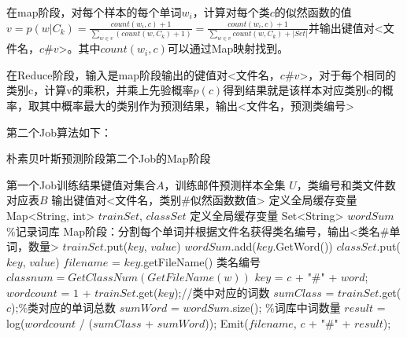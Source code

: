 \documentclass[lang=cn,11pt]{elegantpaper}
\begin{document}
在map阶段，对每个样本的每个单词$w_i$，计算对每个类$c$的似然函数的值$v=p(w|C_{k})=\frac{count(w_i, c)+1}{\sum_{w \in v}(count(w, C_{k})+1)}=\frac{count(w_i, c)+1}{\sum_{w \in v}count(w, C_{k})+|Set|}$并输出键值对<文件名，$c\#v$>。其中$count(w_i, c)$可以通过Map映射找到。

在Reduce阶段，输入是map阶段输出的键值对<文件名，$c\#v$>，对于每个相同的类别c，计算v的乘积，并乘上先验概率$p(c)$得到结果就是该样本对应类别c的概率，取其中概率最大的类别作为预测结果，输出<文件名，预测类编号>

第二个Job算法如下：

\begin{algorithm}[!htb]
  \caption{朴素贝叶斯预测阶段第二个Job的Map阶段}
  \label{alg:Framwork}
  \begin{algorithmic}[1]
    \Require
    第一个Job训练结果键值对集合$A$，训练邮件预测样本全集 $U$，类编号和类文件数对应表$B$
    \Ensure
    输出键值对<文件名，类别\#似然函数数值>
  \State 定义全局缓存变量 Map<String, int> $trainSet$, $classSet$
  \State 定义全局缓存变量 Set<String> $wordSum$  \quad  \%记录词库
  \State Map阶段：分割每个单词并根据文件名获得类名编号，输出<类名\#单词，数量>
      \State $trainSet$.put($key$, $value$)
      \State $wordSum$.add($key$.GetWord())
    \EndFor
      \State $classSet$.put($key$, $value$)
    \EndFor
  \EndFunction
    \State $filename$ = $key$.getFileName()
      \State 类名编号$classnum = GetClassNum(GetFileName(w))$
        \State $key$ = $c$ + "\#" + $word$;
        \State $wordcount$ = $1$ + $trainSet$.get($key$);//类中对应的词数
        \State $sumClass$ = $trainSet$.get($c$);\quad  \%类对应的单词总数
        \State $sumWord$ = $wordSum$.size(); \quad  \%词库中词数量
        \State $result$ = log($wordcount$ / ($sumClass$ + $sumWord$));
        \State Emit($filename$, $c$ + "\#" + $result$);
   		\EndFor
   \EndFor
  \EndFunction
	\end{algorithmic}
\end{algorithm}
\end{document}
